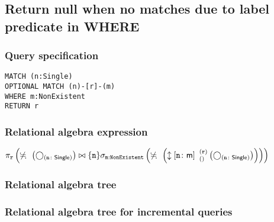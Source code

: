 \subsection{Return null when no matches due to label predicate in WHERE}

\subsubsection*{Query specification}

\begin{lstlisting}
MATCH (n:Single)
OPTIONAL MATCH (n)-[r]-(m)
WHERE m:NonExistent
RETURN r
\end{lstlisting}

\subsubsection*{Relational algebra expression}

$\projection{\var{r}} \left(\alldifferent{} \left(\getvertices{n}{Single}\right) \join \{\var{n}\} \selection{\mathtt{m:NonExistent}} \left(\alldifferent{} \left(\expandboth{n}{m}{}{r}{} \left(\getvertices{n}{Single}\right)\right)\right)\right)$

\subsubsection*{Relational algebra tree}


\subsubsection*{Relational algebra tree for incremental queries}

